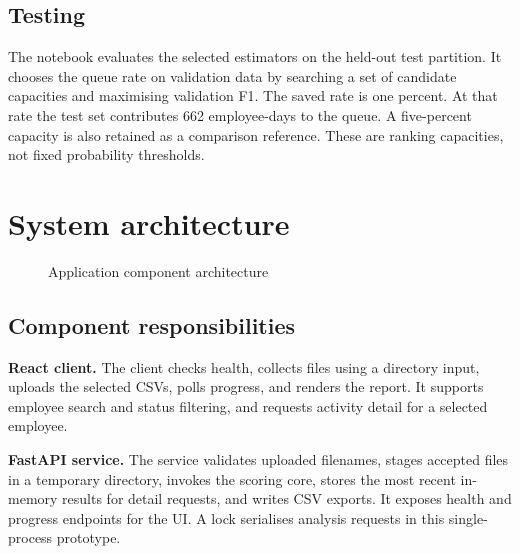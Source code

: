 \documentclass[12pt,a4paper,oneside]{report}
\begin{document}
\subsection{Testing}
The notebook evaluates the selected estimators on the held-out test
partition. It chooses the queue rate on validation data by searching a
set of candidate capacities and maximising validation F1. The saved
rate is one percent. At that rate the test set contributes 662
employee-days to the queue. A five-percent capacity is also retained
as a comparison reference. These are ranking capacities, not fixed
probability thresholds.

\section{System architecture}
\begin{figure}[H]
\centering
{}
\caption{Application component architecture}
\label{fig:architecture}
\end{figure}

\subsection{Component responsibilities}
\textbf{React client.} The client checks health, collects files using a
directory input, uploads the selected CSVs, polls progress, and
renders the report. It supports employee search and status filtering,
and requests activity detail for a selected employee.

\textbf{FastAPI service.} The service validates uploaded filenames,
stages accepted files in a temporary directory, invokes the scoring
core, stores the most recent in-memory results for detail requests,
and writes CSV exports. It exposes health and progress endpoints for
the UI. A lock serialises analysis requests in this single-process
prototype.
\end{document}
